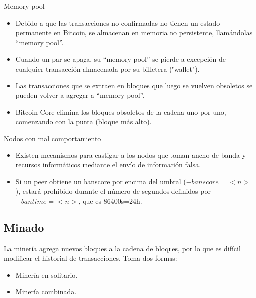 \documentclass[compress,brown,xcolor=table]{beamer}
\begin{document}
\begin{frame}{Memory pool}

\begin{itemize}
	\item Debido a que las transacciones no confirmadas no tienen un estado permanente en Bitcoin, se almacenan en memoria no persistente, llamándolas ``memory pool''.
	
	\item Cuando un par se apaga, su ``memory pool'' se pierde a excepción de cualquier transacción almacenada por su billetera ("wallet").\\

	\item Las transacciones que se extraen en bloques que luego se vuelven obsoletos se pueden volver a agregar a ``memory pool''.\\

	\item Bitcoin Core elimina los bloques obsoletos de la cadena uno por uno, comenzando con la punta (bloque más alto).
\end{itemize}

\end{frame}

\begin{frame}{Nodos con mal comportamiento}
\begin{itemize}
	\item Existen mecanismos para castigar a los nodos que toman ancho de banda y recursos informáticos mediante el envío de información falsa.

	\item Si un peer obtiene un banscore por encima del umbral ($-banscore = <n>$), estará prohibido durante el número de segundos definidos por $-bantime = <n>$, que es 86400s=24h.
\end{itemize}
\end{frame}

\subsection{Minado}
\frame{\sectionpage}

\begin{frame}
La minería agrega nuevos bloques a la cadena de bloques, por lo que es difícil modificar el historial de transacciones. Toma dos formas:
\begin{itemize}
	\item Minería en solitario.
	\item Minería combinada.
\end{itemize}
\end{frame}
\end{document}
